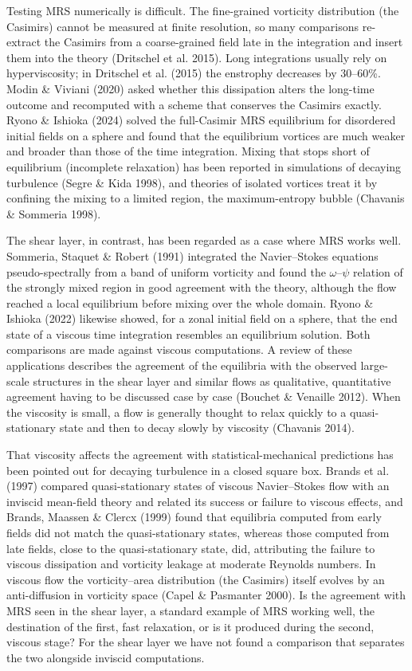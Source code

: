 \documentclass[11pt]{article}
\begin{document}
Testing MRS numerically is difficult. The fine-grained vorticity distribution (the Casimirs) cannot be measured at finite resolution, so many comparisons re-extract the Casimirs from a coarse-grained field late in the integration and insert them into the theory (Dritschel et al. 2015). Long integrations usually rely on hyperviscosity; in Dritschel et al. (2015) the enstrophy decreases by 30--60\%. Modin \& Viviani (2020) asked whether this dissipation alters the long-time outcome and recomputed with a scheme that conserves the Casimirs exactly. Ryono \& Ishioka (2024) solved the full-Casimir MRS equilibrium for disordered initial fields on a sphere and found that the equilibrium vortices are much weaker and broader than those of the time integration. Mixing that stops short of equilibrium (incomplete relaxation) has been reported in simulations of decaying turbulence (Segre \& Kida 1998), and theories of isolated vortices treat it by confining the mixing to a limited region, the maximum-entropy bubble (Chavanis \& Sommeria 1998).

The shear layer, in contrast, has been regarded as a case where MRS works well. Sommeria, Staquet \& Robert (1991) integrated the Navier--Stokes equations pseudo-spectrally from a band of uniform vorticity and found the $\omega{}$--$\psi{}$ relation of the strongly mixed region in good agreement with the theory, although the flow reached a local equilibrium before mixing over the whole domain. Ryono \& Ishioka (2022) likewise showed, for a zonal initial field on a sphere, that the end state of a viscous time integration resembles an equilibrium solution. Both comparisons are made against viscous computations. A review of these applications describes the agreement of the equilibria with the observed large-scale structures in the shear layer and similar flows as qualitative, quantitative agreement having to be discussed case by case (Bouchet \& Venaille 2012). When the viscosity is small, a flow is generally thought to relax quickly to a quasi-stationary state and then to decay slowly by viscosity (Chavanis 2014).

That viscosity affects the agreement with statistical-mechanical predictions has been pointed out for decaying turbulence in a closed square box. Brands et al. (1997) compared quasi-stationary states of viscous Navier--Stokes flow with an inviscid mean-field theory and related its success or failure to viscous effects, and Brands, Maassen \& Clercx (1999) found that equilibria computed from early fields did not match the quasi-stationary states, whereas those computed from late fields, close to the quasi-stationary state, did, attributing the failure to viscous dissipation and vorticity leakage at moderate Reynolds numbers. In viscous flow the vorticity--area distribution (the Casimirs) itself evolves by an anti-diffusion in vorticity space (Capel \& Pasmanter 2000). Is the agreement with MRS seen in the shear layer, a standard example of MRS working well, the destination of the first, fast relaxation, or is it produced during the second, viscous stage? For the shear layer we have not found a comparison that separates the two alongside inviscid computations.
\end{document}
